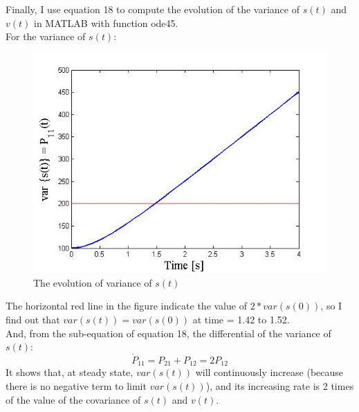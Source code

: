 \documentclass{article}
\begin{document}
Finally, I use equation 18 to compute the evolution of the variance of $s(t)$ and $v(t)$ in MATLAB with function ode45.\\
For the variance of $s(t)$:
\begin{figure}[H]
\begin{center}
	\includegraphics[scale=0.5]{figure/hw4_vars.jpg}
	\caption{The evolution of variance of $ s(t) $}
\end{center}
\end{figure}
The horizontal red line in the figure indicate the value of $2*var(s(0))$, so I find out that $var(s(t))=var(s(0))$ at time = 1.42 to 1.52. \\
And, from the sub-equation of equation 18, the differential of the variance of $s(t)$:
\begin{equation}
	\dot P_{11}  = P_{21}  + P_{12}  = 2P_{12} 
\end{equation}
It shows that, at steady state, $var(s(t))$ will continuously increase (because there is no negative term to limit $var(s(t))$), and its increasing rate is 
2 times of the value of the covariance of $s(t)$ and $v(t)$.\\
\end{document}
